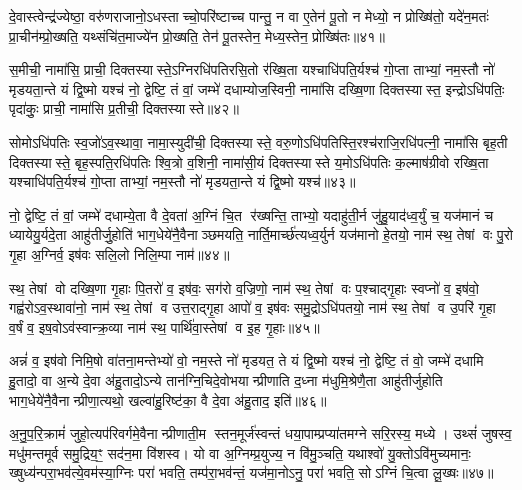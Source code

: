 दे॒वास्त्वेन्द्र॑ज्येष्ठा॒ वरु॑णराजानो॒ऽधस्ताच्चो॒परि॑ष्टाच्च पान्तु॒ न वा ए॒तेन॑ पू॒तो न मेध्यो॒ न प्रोख्षि॑तो॒ यदे॑न॒मतः॑ प्रा॒चीन॑म्प्रो॒ख्षति॒ यथ्संचि॑त॒माज्ये॑न प्रो॒ख्षति॒ तेन॑ पू॒तस्तेन॒ मेध्य॒स्तेन॒ प्रोख्षि॑तः॥४१॥

{\anuvakamend[{दु॒ध्रस्त॒नूर्\mbox{}ह॒विर्भा॑गाः पातु॒ द्वात्रिꣳ॑शच्च॥९॥}]}

स॒मीची॒ नामा॑सि॒ प्राची॒ दिक्तस्यास्ते॒ऽग्निरधि॑पतिरसि॒तो र॑ख्षि॒ता यश्चाधि॑पति॒र्यश्च॑ गो॒प्ता ताभ्यां॒ नम॒स्तौ नो॑ मृडयता॒न्ते यं द्वि॒ष्मो यश्च॑ नो॒ द्वेष्टि॒ तं वां॒ जम्भे॑ दधाम्योज॒स्विनी॒ नामा॑सि दख्षि॒णा दिक्तस्यास्त॒ इन्द्रोऽधि॑पतिः॒ पृदा॑कुः॒ प्राची॒ नामा॑सि प्र॒तीची॒ दिक्तस्यास्ते॥४२॥

सोमोऽधि॑पतिः स्व॒जो॑ऽव॒स्थावा॒ नामा॒स्युदी॑ची॒ दिक्तस्यास्ते॒ वरु॒णोऽधि॑पतिस्ति॒रश्च॑राजि॒रधि॑पत्नी॒ नामा॑सि बृह॒ती दिक्तस्यास्ते॒ बृह॒स्पति॒रधि॑पतिः श्वि॒त्रो व॒शिनी॒ नामा॑सी॒यं दिक्तस्यास्ते य॒मोऽधि॑पतिः क॒ल्माष॑ग्रीवो रख्षि॒ता यश्चाधि॑पति॒र्यश्च॑ गो॒प्ता ताभ्यां॒ नम॒स्तौ नो॑ मृडयता॒न्ते यं द्वि॒ष्मो यश्च॑॥४३॥

नो॒ द्वेष्टि॒ तं वां॒ जम्भे॑ दधाम्ये॒ता वै दे॒वता॑ अ॒ग्निं चि॒त र॑ख्षन्ति॒ ताभ्यो॒ यदाहु॑ती॒र्न जु॑हु॒याद॑ध्व॒र्युं च॒ यज॑मानं च ध्यायेयु॒र्यदे॒ता आहु॑तीर्जु॒होति॑ भाग॒धेये॑नै॒वैनाञ्छमयति॒ नार्ति॒मार्च्छ॑त्यध्व॒र्युर्न यज॑मानो हे॒तयो॒ नाम॑ स्थ॒ तेषां वः पु॒रो गृ॒हा अ॒ग्निर्व॒ इष॑वः सलि॒लो निलि॒म्पा नाम॑॥४४॥

स्थ॒ तेषां वो दख्षि॒णा गृ॒हाः पि॒तरो॑ व॒ इष॑वः॒ सग॑रो व॒ज्रिणो॒ नाम॑ स्थ॒ तेषां वः प॒श्चाद्गृ॒हाः स्वप्नो॑ व॒ इष॑वो॒ गह्व॑रोऽव॒स्थावा॑नो॒ नाम॑ स्थ॒ तेषां व उत्त॒राद्गृ॒हा आपो॑ व॒ इष॑वः समु॒द्रोऽधि॑पतयो॒ नाम॑ स्थ॒ तेषां व उ॒परि॑ गृ॒हा व॒र्\mbox{}षं व॒ इष॒वोऽव॑स्वान्क्र॒व्या नाम॑ स्थ॒ पार्थि॑वा॒स्तेषां व इ॒ह गृ॒हाः॥४५॥

अन्नं॑ व॒ इष॑वो निमि॒षो वा॑तना॒मन्तेभ्यो॑ वो॒ नम॒स्ते नो॑ मृडयत॒ ते यं द्वि॒ष्मो यश्च॑ नो॒ द्वेष्टि॒ तं वो॒ जम्भे॑ दधामि हु॒तादो॒ वा अ॒न्ये दे॒वा अ॑हु॒तादो॒ऽन्ये तान॑ग्नि॒चिदे॒वोभयान्प्रीणाति द॒ध्ना म॑धुमि॒श्रेणै॒ता आहु॑तीर्जुहोति भाग॒धेये॑नै॒वैनान्प्रीणा॒त्यथो॒ खल्वा॑हु॒रिष्ट॑का॒ वै दे॒वा अ॑हु॒ताद॒ इति॑॥४६॥

अ॒नु॒प॒रि॒क्रामं॑ जुहो॒त्यप॑रिवर्गमे॒वैनान्प्रीणाती॒म स्तन॒मूर्ज॑स्वन्तं धया॒पाम्प्रप्या॑तमग्ने सरि॒रस्य॒ मध्ये। उथ्सं॑ जुषस्व॒ मधु॑मन्तमूर्व समु॒द्रिय॒ꣳ॒ सद॑न॒मा वि॑शस्व। यो वा अ॒ग्निम्प्र॒युज्य॒ न वि॑मु॒ञ्चति॒ यथाश्वो॑ यु॒क्तोऽवि॑मुच्यमानः॒ ख्षुध्य॑न्परा॒भव॑त्ये॒वम॑स्या॒ग्निः परा॑ भवति॒ तम्प॑रा॒भव॑न्तं॒ यज॑मा॒नोऽनु॒ परा॑ भवति॒ सोऽग्निं चि॒त्वा लू॒ख्षः॥४७॥

